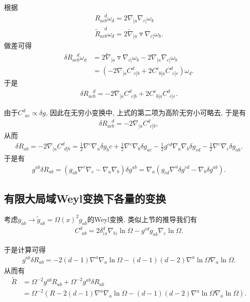 根据
\begin{align}
    R_{acb}^{~~~~d}\omega_d=2\nabla_{[a}\nabla_{c]}\omega_b\\
    \tilde R_{acb}^{~~~~d}\omega_d=2\tilde \nabla_{[a}\triangledown\nabla_{c]}\omega_b.
\end{align}
做差可得
\begin{align}
    \delta R_{acb}^{~~~~d}\omega_d&=2\tilde \nabla_{[a}\triangledown\nabla_{c]}\omega_b-2\nabla_{[a}\nabla_{c]}\omega_b\\
    &=(-2\nabla_{[a}C^d_{~~c]b}+2C^e_{~~b[a}C^d_{~~c]e})\omega_d.
\end{align}
于是
\begin{align}
    \delta R_{acb}^{~~~~d}=-2\nabla_{[a}C^d_{~~c]b}+2C^e_{~~b[a}C^d_{~~c]e}.
\end{align}

由于$C^d_{~~ac}\propto \delta g$, 因此在无穷小变换中, 上式的第二项为高阶无穷小可略去, 于是有
\begin{align}
    \delta R_{acb}^{~~~~d}=-2\nabla_{[a}C^d_{~~c]b},
\end{align}
从而
\begin{align}
    \delta R_{ab}=-2\nabla_{[a}C^d_{~~d]b}=\frac12\nabla^c\nabla_a\delta g_bc+\frac12\nabla^c\nabla_b\delta g_{ac}-\frac12 g^{cd}\nabla_a\nabla_b\delta g_{cd}-\frac12\nabla^c\nabla_c\delta g_{ab}.
\end{align}
于是有
\begin{align}
    g^{ab}\delta R_{ab}=\left(g_{ab}\nabla^c\nabla_c-\nabla_a\nabla_b\right)\delta g^{ab}=\nabla_a\left(g_{cd}\nabla^a\delta g^{cd}-\nabla_b\delta g^{ab}\right).
\end{align}

\subsection{有限大局域Weyl变换下各量的变换}\label{finite-weyl-transf}
考虑$g_{ab}\to\tilde g_{ab}=\Omega(x)^2g_{ab}$的Weyl变换. 类似上节的推导我们有
\begin{align}
    C^d_{~~ab}=2\delta^d_{(a}\nabla_{b)}\ln\Omega-g^{cd}g_{ab}\nabla_c\ln\Omega.
\end{align}

于是计算可得
\begin{align}
    g^{ab}\delta R_{ab}=-2(d-1)\nabla^a\nabla_a\ln\Omega-(d-1)(d-2)\nabla^a\ln\Omega\nabla_a\ln\Omega.
\end{align}
从而有
\begin{align}
    \tilde R&=\Omega^{-2}g^{ab}R_{ab}+\Omega^{-2}g^{ab}\delta R_{ab}\\
    &=\Omega^{-2}\left(R-2(d-1)\nabla^a\nabla_a\ln\Omega-(d-1)(d-2)\nabla^a\ln\Omega\nabla_a\ln\Omega\right).
\end{align}